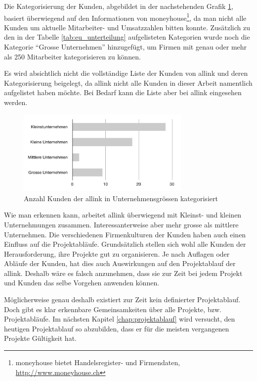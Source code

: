 Die Kategorisierung der Kunden, abgebildet in der nachstehenden Grafik \ref{pic:kundenkategorisierung},
basiert überwiegend auf den Informationen von moneyhouse\footnote{moneyhouse bietet Handelsregister- und Firmendaten, \url{http://www.moneyhouse.ch}}, 
da man nicht alle Kunden um aktuelle Mitarbeiter- und Umsatzzahlen bitten konnte.
Zusätzlich zu den in der Tabelle \ref{tab:eu_unterteilung} aufgelisteten Kategorien 
wurde noch die Kategorie ``Grosse Unternehmen'' hinzugefügt, um Firmen mit genau 
oder mehr als 250 Mitarbeiter kategorisieren zu können.

Es wird absichtlich nicht die vollständige Liste der Kunden von allink und deren 
Kategorisierung beigelegt, da allink nicht alle Kunden in dieser Arbeit namentlich 
aufgelistet haben möchte. Bei Bedarf kann die Liste aber bei allink eingesehen werden.

\begin{figure}[htbp]
\begin{center}
\includegraphics[width=0.75\textwidth,angle=0]{./bilder/analyse/kundenkategorisierung.pdf}
\caption{Anzahl Kunden der allink in Unternehmensgrössen kategorisiert}
\label{pic:kundenkategorisierung}
\end{center}
\end{figure}

Wie man erkennen kann, arbeitet allink überwiegend mit Kleinst- und kleinen 
Unternehmungen zusammen. Interessanterweise aber mehr grosse als mittlere
Unternehmen. Die verschiedenen Firmenkulturen der Kunden haben auch einen 
Einfluss auf die Projektabläufe. Grundsätzlich stellen sich wohl alle Kunden
der Herausforderung, ihre Projekte gut zu organisieren. Je nach Auflagen oder
Abläufe der Kunden, hat dies auch Auswirkungen auf den Projektablauf der allink.
Deshalb wäre es falsch anzunehmen, dass sie zur Zeit bei jedem Projekt und 
Kunden das selbe Vorgehen anwenden können.

Möglicherweise genau deshalb existiert zur Zeit kein definierter Projektablauf. 
Doch gibt es klar erkennbare Gemeinsamkeiten über alle Projekte, bzw. Projektabläufe.
Im nächsten Kapitel \ref{chap:projektablauf} wird versucht, den heutigen Projektablauf so 
abzubilden, dass er für die meisten vergangenen Projekte Gültigkeit hat.

